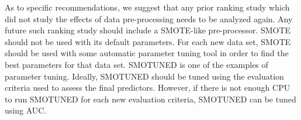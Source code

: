 \documentclass[sigconf]{acmart}
\theoremstyle{break}
\newcommand{\sma}{{\sc SMOTE}}
\newcommand{\smb}{{\sc SMOTUNED}}
\begin{document}
As to specific recommendations, we suggest that any prior ranking study  which did not  study the effects of data pre-processing needs to be analyzed again. Any future such ranking study should include a {\sma}-like
 pre-processor. {\sma} should not be used with its default parameters.
 For each new data set, {\sma} should be used with some automatic parameter tuning tool in
order to find the best parameters for that data set. {\smb} is one of the examples of parameter tuning. Ideally, {\smb} should be tuned using the evaluation criteria used to assess the final predictors. However, if there is not enough CPU to run {\smb} for each new evaluation criteria, {\smb} can be tuned using AUC.





\balance

%


%

\end{document}
